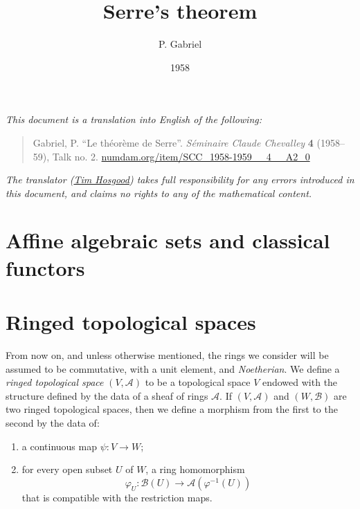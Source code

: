 \documentclass[british]{article}
\title{Serre's theorem}
\author{P. Gabriel}
\date{1958}
\providecommand{\tightlist}{%
\setlength{\itemsep}{0pt}\setlength{\parskip}{0pt}}
\newcommand{\oldpage}[1]{\marginpar{\footnotesize$\Big\vert$ \textit{p.~#1}}}
\begin{document}
\maketitle
\thispagestyle{fancy}

\setcounter{footnote}{0}



\emph{This document is a translation into English of the following:}

\begin{quote}
Gabriel, P. ``Le théorème de Serre''. \emph{Séminaire Claude Chevalley}
\textbf{4} (1958--59), Talk no. 2.
\href{http://www.numdam.org/item/SCC_1958-1959__4__A2_0}{numdam.org/item/SCC\_1958-1959\_\_4\_\_A2\_0}
\end{quote}

\emph{The translator (\href{https://thosgood.net}{Tim Hosgood}) takes
full responsibility for any errors introduced in this document, and
claims no rights to any of the mathematical content.}

\tableofcontents

\providecommand{\scr}[1]{{\mathscr{#1}}}
\renewcommand{\cal}[1]{{\mathcal{#1}}}
\renewcommand{\frak}[1]{{\mathfrak{#1}}}
\renewcommand{\geq}{\geqslant}
\renewcommand{\leq}{\leqslant}

\section*{Affine algebraic sets and classical
functors}\label{affine-algebraic-sets-and-classical-functors}

\section{Ringed topological spaces}\label{section-1}

\oldpage{2-01}

From now on, and unless otherwise mentioned, the rings we consider will
be assumed to be commutative, with a unit element, and
\emph{Noetherian}. We define a \emph{ringed topological space}
\((V,{\mathscr{A}})\) to be a topological space \(V\) endowed with the
structure defined by the data of a sheaf of rings \({\mathscr{A}}\). If
\((V,{\mathscr{A}})\) and \((W,{\mathscr{B}})\) are two ringed
topological spaces, then we define a morphism from the first to the
second by the data of:

\begin{enumerate}
\def\labelenumi{\alph{enumi}.}
\tightlist
\item
  a continuous map \(\psi\colon V\to W\);
\item
  for every open subset \(U\) of \(W\), a ring homomorphism \[
     \varphi_U\colon{\mathscr{B}}(U)\to{\mathscr{A}}(\varphi^{-1}(U))
   \] that is compatible with the restriction maps.
\end{enumerate}
\end{document}
